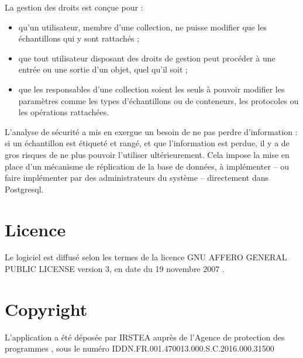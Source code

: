 La gestion des droits est conçue pour :
\begin{itemize}
\item qu'un utilisateur, membre d'une collection, ne puisse modifier que les échantillons qui y sont rattachés ;
\item que tout utilisateur disposant des droits de gestion peut procéder à une entrée ou une sortie d'un objet, quel qu'il soit ;
\item que les responsables d'une collection soient les seuls à pouvoir modifier les paramètres comme les types d'échantillons ou de conteneurs, les protocoles ou les opérations rattachées.
\end{itemize}
L'analyse de sécurité a mis en exergue un besoin de ne pas perdre d'information : si un échantillon est étiqueté et rangé, et que l'information est perdue, il y a de gros risques de ne plus pouvoir l'utiliser ultérieurement. Cela impose la mise en place d'un mécanisme de réplication de la base de données, à implémenter -- ou faire implémenter par des administrateurs du système -- directement dans Postgresql.

\section{Licence}
Le logiciel est diffusé selon les termes de la licence GNU AFFERO GENERAL PUBLIC LICENSE version 3, en date du 19 novembre 2007 \cite{agpl}.

\section{Copyright}

L'application a été déposée par IRSTEA auprès de l'Agence de protection des programmes \cite{app}, sous le numéro IDDN.FR.001.470013.000.S.C.2016.000.31500
